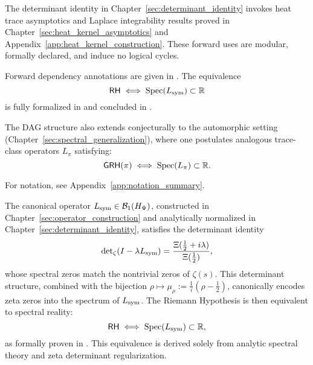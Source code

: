 \begin{remark}
The determinant identity in Chapter~\ref{sec:determinant_identity} invokes heat trace asymptotics and Laplace integrability results proved in Chapter~\ref{sec:heat_kernel_asymptotics} and Appendix~\ref{app:heat_kernel_construction}. These forward uses are modular, formally declared, and induce no logical cycles.
\end{remark}

\medskip

Forward dependency annotations are given in . The equivalence
\[
\mathsf{RH} \iff \operatorname{Spec}(L_{\mathrm{sym}}) \subset \mathbb{R}
\]
is fully formalized in  and concluded in .

The DAG structure also extends conjecturally to the automorphic setting (Chapter~\ref{sec:spectral_generalization}), where one postulates analogous trace-class operators \( L_\pi \) satisfying:
\[
\mathsf{GRH}(\pi) \iff \operatorname{Spec}(L_\pi) \subset \mathbb{R}.
\]

For notation, see Appendix~\ref{app:notation_summary}.

\begin{tcolorbox}[colback=gray!2!white, colframe=black!50, title={\textbf{Canonical Equivalence — RH via Spectral Reality}}]
The canonical operator \( L_{\mathrm{sym}} \in \mathcal{B}_1(H_{\Psi}) \), constructed in Chapter~\ref{sec:operator_construction} and analytically normalized in Chapter~\ref{sec:determinant_identity}, satisfies the determinant identity
\[
\det\nolimits_{\zeta}(I - \lambda L_{\mathrm{sym}}) = \frac{\Xi(\tfrac{1}{2} + i\lambda)}{\Xi(\tfrac{1}{2})},
\]
whose spectral zeros match the nontrivial zeros of \( \zeta(s) \). This determinant structure, combined with the bijection \( \rho \mapsto \mu_\rho := \tfrac{1}{i}(\rho - \tfrac{1}{2}) \), canonically encodes zeta zeros into the spectrum of \( L_{\mathrm{sym}} \). The Riemann Hypothesis is then equivalent to spectral reality:
\[
\mathsf{RH} \iff \operatorname{Spec}(L_{\mathrm{sym}}) \subset \mathbb{R},
\]
as formally proven in . This equivalence is derived solely from analytic spectral theory and zeta determinant regularization.
\end{tcolorbox}
